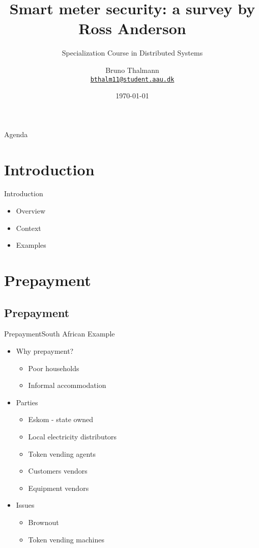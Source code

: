 \documentclass[10pt]{beamer}
\title{Smart meter security: a survey by Ross Anderson}
\subtitle{Specialization Course in Distributed Systems}  %
\date{\today}
\author{
  Bruno Thalmann\\
  \href{mailto:bthalm11@student.aau.dk}{{\tt bthalm11@student.aau.dk}}
}
\institute[
  Dept.\ of Computer Science\\
  Aalborg University\\
  Denmark
] %
{%
  Department of Computer Science\\
  Aalborg University\\
  Denmark
  
}
\begin{document}
{\aauwavesbg%
\begin{frame} %
  \titlepage
\end{frame}}

\begin{frame}{Agenda}{}
\tableofcontents
\end{frame}

\section{Introduction}
\begin{frame}{Introduction}{}
	\begin{itemize}
		\item Overview
		
		\hfil
		\item Context
		
		\hfil
		\item Examples
	\end{itemize}
\end{frame}

\section{Prepayment}
\subsection{Prepayment}
\begin{frame}{Prepayment}{South African Example}
  \begin{itemize}
  	\item Why prepayment?
  	\begin{itemize}
  		\item Poor households
  		\item Informal accommodation
  	\end{itemize}
    \item Parties
    \begin{itemize}
    	\item Eskom - state owned
    	\item Local electricity distributors
    	\item Token vending agents
    	\item Customers vendors
    	\item Equipment vendors
    \end{itemize}
    \item Issues
    \begin{itemize}
    	\item Brownout
    	\item Token vending machines
    \end{itemize}
  \end{itemize}
\end{frame}
\end{document}
